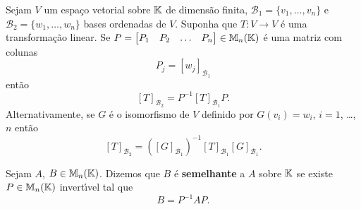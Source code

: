 \begin{teorema}
	Sejam $V$ um espa\c{c}o vetorial sobre $\mathbb{K}$ de dimens\~ao finita, $\mathcal{B}_1 = \{v_1,\dots,v_n\}$ e $\mathcal{B}_2 = \{w_1,\dots,w_n\}$ bases ordenadas de $V$. Suponha que $T : V \to V$ \'e uma transforma\c{c}\~ao linear. Se $P = \begin{bmatrix}P_1 & P_2 & \dots & P_n
	\end{bmatrix} \in \mathbb{M}_n(\mathbb{K})$ \'e uma matriz com colunas
	\[
		P_j = [w_j]_{\mathcal{B}_1}
	\]
	ent\~ao
	\[
		[T]_{\mathcal{B}_2} = P^{-1}[T]_{\mathcal{B}_1}P.
	\]
	Alternativamente, se $G$ \'e o isomorfismo de $V$ definido por $G(v_i) = w_i$, $i = 1$, \dots, $n$ ent\~ao
	\[
		[T]_{\mathcal{B}_2} = ([G]_{\mathcal{B}_1})^{-1}[T]_{\mathcal{B}_1}[G]_{\mathcal{B}_1}.
	\]
\end{teorema}

\begin{definicao}
	Sejam $A$, $B \in \mathbb{M}_n(\mathbb{K})$. Dizemos que $B$ \'e \textbf{semelhante} a $A$ sobre $\mathbb{K}$ se existe $P \in \mathbb{M}_n(\mathbb{K})$ invert{\'\i}vel tal que
	\[
		B = P^{-1}AP.
	\]
\end{definicao}

